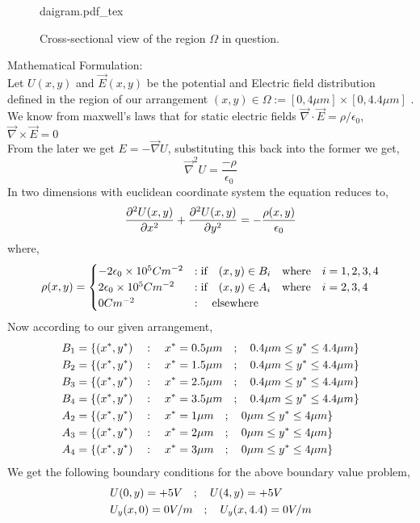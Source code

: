 \begin{figure}[ht]
    \centering
    \def\svgwidth{0.6\textwidth}
    {daigram.pdf_tex}
    \caption{Cross-sectional view of the region $\Omega$ in question.}
    \label{fig:}
\end{figure}

Mathematical Formulation:\\
Let $U(x,y)$ and $\vec{E}(x,y)$ be the potential and Electric field distribution defined in the region of our arrangement $(x,y) \in \Omega := [0,4\mu m]\times[0,4.4\mu m]$ .\\
We know from maxwell's laws that for static electric fields $\vec{\nabla} \cdot \vec{E} = \rho / \epsilon_0 $, $\vec{\nabla} \times \vec{E} = 0$
\\
From the later we get $E=-\vec{\nabla}U$, substituting this back into the former we get,
\begin{equation*}
    \vec{\nabla}^2 U = \frac{-\rho}{\epsilon_0}  
\end{equation*}
In two dimensions with euclidean coordinate system the equation reduces to, 
\begin{equation}
    \frac{\partial^2U(x,y) }{\partial x^{2}} + \frac{\partial^2U(x,y) }{\partial y^{2}}= -\frac{\rho(x,y)}{\epsilon_0} \\
\end{equation}
where,
\begin{equation}
\rho(x,y) =  \begin{cases}
    -2\epsilon_0 \times 10^5 C m^{-2} & :\text{if} \hspace{0.35cm} (x,y) \in B_i \hspace{0.35cm} \text{where} \hspace{0.35cm} i = 1,2,3,4 \\
    2\epsilon_0 \times 10^5 C m^{-2} & :\text{if} \hspace{0.35cm} (x,y) \in A_i \hspace{0.35cm} \text{where} \hspace{0.35cm} i = 2,3,4  \\
    0 C m^{-2} & : \hspace{0.35cm} \text{elsewhere}
\end{cases}  
\end{equation}
Now according to our given arrangement,
\begin{align}
    B_1 &= \{ (x^*,y^*) \hspace{0.35cm} : \hspace{0.35cm} x^*= 0.5\mu m \hspace{0.35cm};\hspace{0.35cm} 0.4\mu m \leq y^* \leq 4.4\mu m \} \\
    B_2 &= \{ (x^*,y^*) \hspace{0.35cm} : \hspace{0.35cm} x^*= 1.5\mu m \hspace{0.35cm};\hspace{0.35cm} 0.4\mu m \leq y^* \leq 4.4\mu m \} \\
    B_3 &= \{ (x^*,y^*) \hspace{0.35cm} : \hspace{0.35cm} x^*= 2.5\mu m \hspace{0.35cm};\hspace{0.35cm} 0.4\mu m \leq y^* \leq 4.4\mu m \} \\
    B_4 &= \{ (x^*,y^*) \hspace{0.35cm} : \hspace{0.35cm} x^*= 3.5\mu m \hspace{0.35cm};\hspace{0.35cm} 0.4\mu m \leq y^* \leq 4.4\mu m \} \\
    A_2 &= \{ (x^*,y^*) \hspace{0.35cm} : \hspace{0.35cm} x^*= 1\mu m \hspace{0.35cm};\hspace{0.35cm} 0\mu m \leq y^* \leq 4\mu m \} \\
    A_3 &= \{ (x^*,y^*) \hspace{0.35cm} : \hspace{0.35cm} x^*= 2\mu m \hspace{0.35cm};\hspace{0.35cm} 0\mu m \leq y^* \leq 4\mu m \} \\
    A_4 &= \{ (x^*,y^*) \hspace{0.35cm} : \hspace{0.35cm} x^*= 3\mu m \hspace{0.35cm};\hspace{0.35cm} 0\mu m \leq y^* \leq 4\mu m \} 
\end{align}
We get the following boundary conditions for the above boundary value problem,
\begin{align}
    & U(0,y) = +5 V \hspace{0.35cm}; \hspace{0.35cm} U(4,y) = +5 V \\ 
    & U_y(x,0) = 0V/m \hspace{0.35cm}; \hspace{0.35cm} U_y(x,4.4) = 0V/m 
\end{align}


